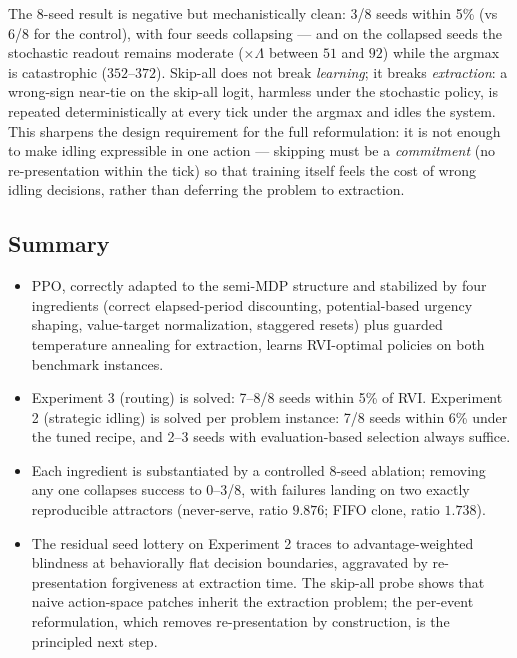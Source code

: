 \documentclass[11pt,a4paper]{article}
\begin{document}
The 8-seed result is negative but mechanistically clean: 3/8 seeds
within 5\% (vs 6/8 for the control), with four seeds collapsing --- and
on the collapsed seeds the stochastic readout remains moderate
($\times\Lambda$ between $51$ and $92$) while the argmax is
catastrophic ($352$--$372$).  Skip-all does not break \emph{learning};
it breaks \emph{extraction}: a wrong-sign near-tie on the skip-all
logit, harmless under the stochastic policy, is repeated
deterministically at every tick under the argmax and idles the system.
This sharpens the design requirement for the full reformulation: it is
not enough to make idling expressible in one action --- skipping must be
a \emph{commitment} (no re-presentation within the tick) so that
training itself feels the cost of wrong idling decisions, rather than
deferring the problem to extraction.

\subsection{Summary}

\begin{itemize}
  \item PPO, correctly adapted to the semi-MDP structure and stabilized
  by four ingredients (correct elapsed-period discounting,
  potential-based urgency shaping, value-target normalization, staggered
  resets) plus guarded temperature annealing for extraction, learns
  RVI-optimal policies on both benchmark instances.
  \item Experiment 3 (routing) is solved: 7--8/8 seeds within 5\% of
  RVI.  Experiment 2 (strategic idling) is solved per problem instance:
  7/8 seeds within 6\% under the tuned recipe, and 2--3 seeds with
  evaluation-based selection always suffice.
  \item Each ingredient is substantiated by a controlled 8-seed
  ablation; removing any one collapses success to 0--3/8, with failures
  landing on two exactly reproducible attractors (never-serve, ratio
  $9.876$; FIFO clone, ratio $1.738$).
  \item The residual seed lottery on Experiment 2 traces to
  advantage-weighted blindness at behaviorally flat decision boundaries,
  aggravated by re-presentation forgiveness at extraction time.  The
  skip-all probe shows that naive action-space patches inherit the
  extraction problem; the per-event reformulation, which removes
  re-presentation by construction, is the principled next step.
\end{itemize}
\end{document}
